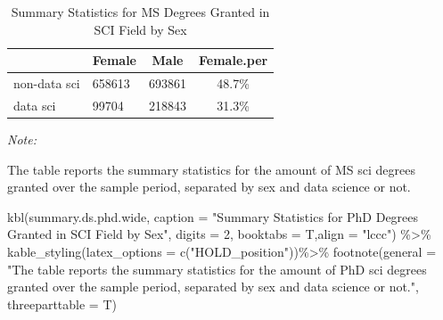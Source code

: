 \documentclass[
  12pt,
]{article}
\newenvironment{Shaded}{\begin{snugshade}}{\end{snugshade}}
\newcommand{\AttributeTok}[1]{\textcolor[rgb]{0.77,0.63,0.00}{#1}}
\newcommand{\DecValTok}[1]{\textcolor[rgb]{0.00,0.00,0.81}{#1}}
\newcommand{\FunctionTok}[1]{\textcolor[rgb]{0.00,0.00,0.00}{#1}}
\newcommand{\NormalTok}[1]{#1}
\newcommand{\SpecialCharTok}[1]{\textcolor[rgb]{0.00,0.00,0.00}{#1}}
\newcommand{\StringTok}[1]{\textcolor[rgb]{0.31,0.60,0.02}{#1}}
\begin{document}
\begin{table}[H]

\caption{\label{tab:unnamed-chunk-12}Summary Statistics for MS Degrees Granted in SCI Field by Sex}
\centering
\begin{threeparttable}
\begin{tabular}[t]{llcc}
\toprule
  & Female & Male & Female.per\\
\midrule
non-data sci & 658613 & 693861 & 48.7\%\\
data sci & 99704 & 218843 & 31.3\%\\
\bottomrule
\end{tabular}
\begin{tablenotes}
\item \textit{Note: } 
\item The table reports the summary statistics for the amount of MS sci degrees granted over the sample period, separated by sex and data science or not.
\end{tablenotes}
\end{threeparttable}
\end{table}

\begin{Shaded}
\begin{Highlighting}[]
\FunctionTok{kbl}\NormalTok{(summary.ds.phd.wide, }\AttributeTok{caption =} \StringTok{"Summary Statistics for PhD Degrees Granted in SCI Field by Sex"}\NormalTok{, }\AttributeTok{digits =} \DecValTok{2}\NormalTok{, }\AttributeTok{booktabs =}\NormalTok{ T,}\AttributeTok{align =} \StringTok{"lccc"}\NormalTok{) }\SpecialCharTok{\%\textgreater{}\%}
  \FunctionTok{kable\_styling}\NormalTok{(}\AttributeTok{latex\_options =} \FunctionTok{c}\NormalTok{(}\StringTok{"HOLD\_position"}\NormalTok{))}\SpecialCharTok{\%\textgreater{}\%}
   \FunctionTok{footnote}\NormalTok{(}\AttributeTok{general =} \StringTok{"The table reports the summary statistics for the amount of PhD sci degrees granted over the sample period, separated by sex and data science or not."}\NormalTok{,}
            \AttributeTok{threeparttable =}\NormalTok{ T)}
\end{Highlighting}
\end{Shaded}
\end{document}

